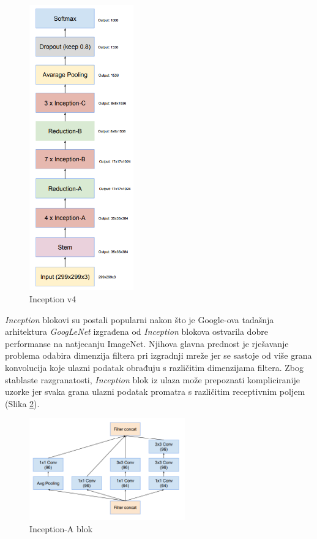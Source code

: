 \documentclass[times, utf8, proizvoljni, numeric]{fer}
\begin{document}
\begin{figure}[!ht]
	\begin{center}
		\captionsetup{justification=centering}
		\includegraphics[width=0.4\textwidth]{./imgs/inceptionv4.png}
		\caption{Inception v4 \cite{Inceptionv4}}
		\label{fg:inceptionv4}
	\end{center}
\end{figure}

\textit{Inception} blokovi su postali popularni nakon što je Google-ova tadašnja arhitektura \textit{GoogLeNet} izgrađena od \textit{Inception} blokova ostvarila dobre performanse na natjecanju ImageNet. Njihova glavna prednost je rješavanje problema odabira dimenzija filtera pri izgradnji mreže jer se sastoje od više grana konvolucija koje ulazni podatak obrađuju s različitim dimenzijama filtera. Zbog stablaste razgranatosti, \textit{Inception} blok iz ulaza može prepoznati kompliciranije uzorke jer svaka grana ulazni podatak promatra s različitim receptivnim poljem (Slika \ref{fg:inception_blok_a}).
	
\begin{figure}[H]
	\begin{center}
		\captionsetup{justification=centering}
		\includegraphics[width=0.6\textwidth]{./imgs/inception_blok_a.png}
		\caption{Inception-A blok  \cite{Inceptionv4}}
		\label{fg:inception_blok_a}
	\end{center}
\end{figure}
\end{document}
